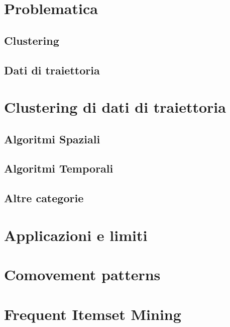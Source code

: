 
\section{Problematica}\label{sec:problem}


\subsection{Clustering}\label{subsec:problem:clustering}


\subsection{Dati di traiettoria}\label{subsec:problem:trajectorydata}


\section{Clustering di dati di traiettoria}\label{sec:problem:trajectoryclustering}


\subsection{Algoritmi Spaziali}\label{subsec:problem:spatialalgorithms}


\subsection{Algoritmi Temporali}\label{subsec:problem:temporalalgorithms}


\subsection{Altre categorie}\label{subsec:problem:othersalgorithms}

\section{Applicazioni e limiti}\label{sec:problem:applicationandlimits}

\section{Comovement patterns}\label{sec:problem:comovements-pattern}

\section{Frequent Itemset Mining}\label{sec:problem:frequent-itemset-mining}

